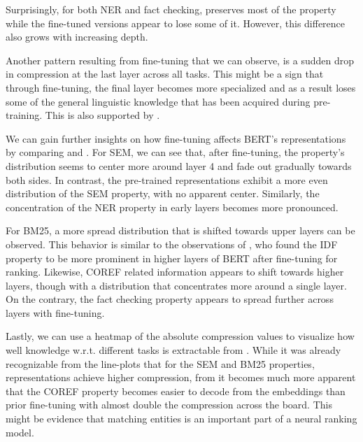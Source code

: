 Surprisingly, for both NER and fact checking,  preserves most of the property while the fine-tuned versions appear to lose some of it. However, this difference also grows with increasing depth.

Another pattern resulting from fine-tuning that we can observe, is a sudden drop in compression at the last layer across all tasks. This might be a sign that through fine-tuning, the final layer becomes more specialized and as a result loses some of the general linguistic knowledge that has been acquired during pre-training. This is also supported by \citep{merchant-etal-2020-happens}.

We can gain further insights on how fine-tuning affects BERT's representations by comparing  and . For SEM, we can see that, after fine-tuning, the property's distribution seems to center more around layer 4 and fade out gradually towards both sides. In contrast, the pre-trained representations exhibit a more even distribution of the SEM property, with no apparent center. Similarly, the concentration of the NER property in early layers becomes more pronounced.

For BM25, a more spread distribution that is shifted towards upper layers can be observed. This behavior is similar to the observations of \citep{https://doi.org/10.48550/arxiv.2202.12191}, who found the IDF property to be more prominent in higher layers of BERT after fine-tuning for ranking. Likewise, COREF related information appears to shift towards higher layers, though with a distribution that concentrates more around a single layer. On the contrary, the fact checking property appears to spread further across layers with fine-tuning.

Lastly, we can use a heatmap of the absolute compression values to visualize how well knowledge w.r.t. different tasks is extractable from . While it was already recognizable from the line-plots that for the SEM and BM25 properties,  representations achieve higher compression, from  it becomes much more apparent that the COREF property becomes easier to decode from the embeddings than prior fine-tuning with almost double the compression across the board. This might be evidence that matching entities is an important part of a neural ranking model.



